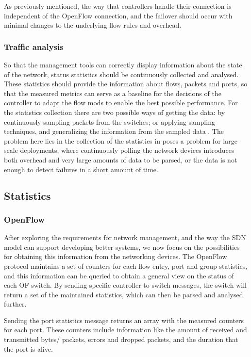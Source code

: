As previously mentioned, the way that controllers handle their connection is independent of the OpenFlow connection, and the failover should occur with minimal changes to the underlying flow rules and overhead.

\subsubsection {Traffic analysis}

So that the management tools can correctly display information about the state of the network, status statistics should be continuously collected and analysed. These
statistics should provide the information about flows, packets and ports, so that the measured metrics can serve as a baseline for the decisions of the controller to
adapt the flow mods to enable the best possible performance. For the statistics collection there are two possible ways of getting the data: by continuously sampling
packets from the switches; or applying sampling techniques, and generalizing the information from the sampled data \cite{curtis_mahout:_2011}. The problem here lies
in the collection of the statistics in poses a problem for large scale deployments, where continuously polling the network devices introduces both overhead and very 
large amounts of data to be parsed, or the data is not enough to detect failures in a short amount of time.

\subsection {Statistics}

\subsubsection {OpenFlow}

After exploring the requirements for network management, and the way the SDN model can support developing better systems, we now focus on the possibilities for
obtaining this information from the networking devices. The OpenFlow protocol maintains a set of counters for each flow entry, port and group statistics, and this
information can be queried to obtain a general view on the status of each OF switch. By sending specific controller-to-switch messages, the switch will return a set
of the maintained statistics, which can then be parsed and analysed further. 

\par Sending the port statistics message returns an array with the measured counters for each port. These counters include information like the amount of received
and transmitted bytes/ packets, errors and dropped packets, and the duration that the port is alive. 

